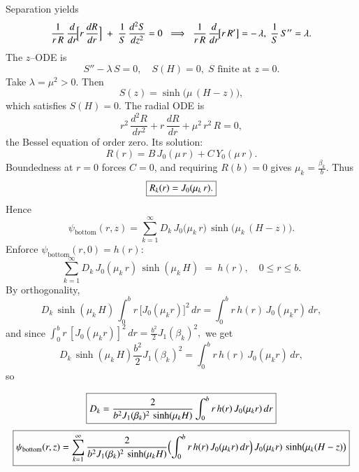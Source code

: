 \documentclass{report}
\begin{document}
\begin{center}

\end{center}

Separation yields
\[
\frac{1}{r\,R}\,\frac{d}{dr}\!\Bigl[r\,\frac{dR}{dr}\Bigr]
\;+\;
\frac{1}{S}\,\frac{d^{2}S}{dz^{2}}
= 0
\;\;\Longrightarrow\;\;
\frac{1}{r\,R}\,\frac{d}{dr}\!\bigl[r\,R'\bigr] = -\,\lambda,\;
\frac{1}{S}\,S'' = \lambda.
\]
The \(z\)–ODE is 
\[
S'' - \lambda\,S = 0,\quad S(H)=0,\;S\text{ finite at }z=0.
\]
Take \(\lambda = \mu^{2} > 0\).  Then
\[
S(z) = \sinh\bigl(\mu\,(H - z)\bigr),
\]
which satisfies \(S(H)=0\).  The radial ODE is
\[
r^{2}\,\frac{d^{2}R}{dr^{2}} + r\,\frac{dR}{dr} + \mu^{2}\,r^{2}\,R = 0,
\]
the Bessel equation of order zero.  Its solution:
\[
R(r) = B\,J_{0}(\mu\,r) + C\,Y_{0}(\mu\,r).
\]
Boundedness at \(r=0\) forces \(C=0\), and requiring \(R(b)=0\) gives \(\mu_{k} = \frac{\beta_{k}}{b}\).  Thus
\[
\boxed{%
R_{k}(r) = J_{0}(\mu_{k}\,r).%
}
\]
Hence
\[
\psi_{\text{bottom}}(r,z)
= \sum_{k=1}^{\infty}
D_{k}\,
J_{0}\!\bigl(\mu_{k}\,r\bigr)\,
\sinh\!\bigl(\mu_{k}\,(H - z)\bigr).
\]
Enforce \(\psi_{\text{bottom}}(r,0)=h(r)\):
\[
\sum_{k=1}^{\infty}
D_{k}\,
J_{0}(\mu_{k}\,r)\,\sinh(\mu_{k}\,H)
\;=\; h(r),\quad 0 \le r \le b.
\]
By orthogonality,
\[
D_{k}\,\sinh(\mu_{k}\,H)\,
\int_{0}^{b} r\,\bigl[J_{0}(\mu_{k}r)\bigr]^{2}\,dr
= \int_{0}^{b} r\,h(r)\,J_{0}(\mu_{k}r)\,dr,
\]
and since 
\(\displaystyle \int_{0}^{b} r\,[J_{0}(\mu_{k}r)]^{2}\,dr = \frac{b^{2}}{2}J_{1}(\beta_{k})^{2},\)
we get
\[
D_{k}\,\sinh(\mu_{k}\,H)\frac{b^{2}}{2}J_{1}(\beta_{k})^{2}
= \int_{0}^{b} r\,h(r)\,J_{0}(\mu_{k}r)\,dr,
\]
so

\[
\boxed{%
D_{k}
= \frac{2}{b^{2}J_{1}(\beta_{k})^{2}\,\sinh(\mu_{k}H)}
\int_{0}^{b} r\,h(r)\,J_{0}(\mu_{k}r)\,dr
}
\]
\[
\boxed{%
\psi_{\text{bottom}}(r,z)
= \sum_{k=1}^{\infty}
\frac{2}{b^{2}J_{1}(\beta_{k})^{2}\,\sinh(\mu_{k}H)}
\Bigl(\int_{0}^{b} r\,h(r)\,J_{0}(\mu_{k}r)\,dr\Bigr)\,
J_{0}(\mu_{k}r)\,\sinh\bigl(\mu_{k}(H - z)\bigr)
}
\]
\end{document}
